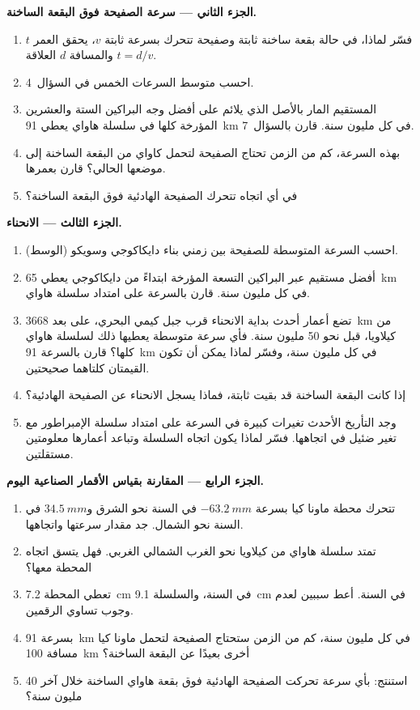 \begin{problem}
\medskip
\noindent\textbf{الجزء الثاني --- سرعة الصفيحة فوق البقعة الساخنة.}
\begin{enumerate}[resume]
  \item فسّر لماذا، في حالة بقعة ساخنة ثابتة وصفيحة تتحرك بسرعة ثابتة
        $v$، يحقق العمر $t$ والمسافة $d$ العلاقة $t = d/v$.
  \item احسب متوسط السرعات الخمس في السؤال~4.
  \item المستقيم المار بالأصل الذي يلائم على أفضل وجه البراكين الستة والعشرين
        المؤرخة كلها في سلسلة هاواي يعطي \qty{91}{km} في كل مليون سنة.
        قارن بالسؤال~7.
  \item بهذه السرعة، كم من الزمن تحتاج الصفيحة لتحمل كاواي من
        البقعة الساخنة إلى موضعها الحالي؟ قارن بعمرها.
  \item في أي اتجاه تتحرك الصفيحة الهادئية فوق البقعة الساخنة؟
\end{enumerate}

\medskip
\noindent\textbf{الجزء الثالث --- الانحناء.}
\begin{enumerate}[resume]
  \item احسب السرعة المتوسطة للصفيحة بين زمني بناء دايكاكوجي
        وسويكو (الوسط).
  \item أفضل مستقيم عبر البراكين التسعة المؤرخة ابتداءً من
        دايكاكوجي يعطي \qty{65}{km} في كل مليون سنة. قارن
        بالسرعة على امتداد سلسلة هاواي.
  \item تضع أعمار أحدث بداية الانحناء قرب جبل كيمي
        البحري، على بعد \qty{3668}{km} من كيلاويا، قبل نحو 50 مليون سنة.
        فأي سرعة متوسطة يعطيها ذلك لسلسلة هاواي كلها؟
        قارن بالسرعة \qty{91}{km} في كل مليون سنة، وفسّر لماذا يمكن أن تكون
        القيمتان كلتاهما صحيحتين.
  \item إذا كانت البقعة الساخنة قد بقيت ثابتة، فماذا يسجل الانحناء عن
        الصفيحة الهادئية؟
  \item وجد التأريخ الأحدث تغيرات كبيرة في السرعة على امتداد سلسلة الإمبراطور
        مع تغير ضئيل في اتجاهها. فسّر لماذا يكون اتجاه
        السلسلة وتباعد أعمارها معلومتين مستقلتين.
\end{enumerate}

\medskip
\noindent\textbf{الجزء الرابع --- المقارنة بقياس الأقمار الصناعية اليوم.}
\begin{enumerate}[resume]
  \item تتحرك محطة ماونا كيا بسرعة $\qty{-63.2}{mm}$ في السنة نحو الشرق
        و$\qty{+34.5}{mm}$ في السنة نحو الشمال. جد مقدار سرعتها واتجاهها.
  \item تمتد سلسلة هاواي من كيلاويا نحو الغرب الشمالي الغربي. فهل
        يتسق اتجاه المحطة معها؟
  \item تعطي المحطة \qty{7.2}{cm} في السنة، والسلسلة \qty{9.1}{cm} في السنة.
        أعط سببين لعدم وجوب تساوي الرقمين.
  \item بسرعة \qty{91}{km} في كل مليون سنة، كم من الزمن ستحتاج الصفيحة
        لتحمل ماونا كيا مسافة \qty{100}{km} أخرى بعيدًا عن البقعة الساخنة؟
  \item استنتج: بأي سرعة تحركت الصفيحة الهادئية فوق بقعة هاواي
        الساخنة خلال آخر 40 مليون سنة؟
\end{enumerate}
\end{problem}
